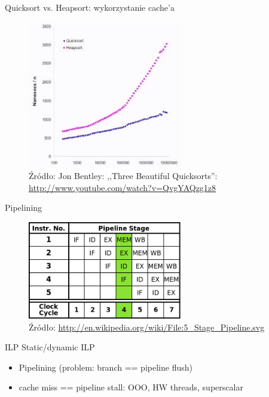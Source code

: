 \begin{frame}{Quicksort vs. Heapsort: wykorzystanie cache'a}
	\begin{figure}[h]
		\includegraphics[width=0.6\textwidth]{gfx/cache_bentley}
		\caption{Źródło: Jon Bentley: ,,Three Beautiful Quicksorts'': \url{http://www.youtube.com/watch?v=QvgYAQzg1z8}}
	\end{figure}
\end{frame}
\begin{frame}{Pipelining}
	\begin{figure}[h]
		\includegraphics[width=0.6\textwidth]{gfx/pipelining}
		\caption{Źródło: \url{http://en.wikipedia.org/wiki/File:5_Stage_Pipeline.svg}}
	\end{figure}
\end{frame}
\begin{frame}[fragile]{ILP}
	Static/dynamic ILP
	\begin{itemize}
		\item Pipelining (problem: branch == pipeline flush)
		\item cache miss == pipeline stall: OOO, HW threads, superscalar
	\end{itemize}
\end{frame}
